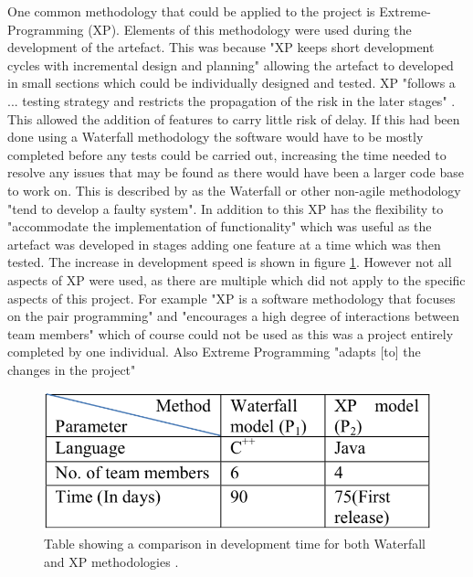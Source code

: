 \documentclass[11pt,a4paper]{report}
\begin{document}
One common methodology that could be applied to the project is Extreme-Programming (XP). Elements of this methodology were used during the development of the artefact. This was because "XP keeps short development cycles with incremental design and planning" \citep{XPsharma2016analysis} allowing the artefact to developed in small sections which could be individually designed and tested. XP "follows a ... testing strategy and restricts the propagation of the risk in the later stages" \citep{XPsharma2016analysis}. This allowed the addition of features to carry little risk of delay. If this had been done using a Waterfall methodology the software would have to be mostly completed before any tests could be carried out, increasing the time needed to resolve any issues that may be found as there would have been a larger code base to work on. This is described by \cite{XPsharma2016analysis} as the Waterfall or other non-agile methodology "tend to develop a faulty system". In addition to this XP has the flexibility to "accommodate the implementation of functionality" \citep{XPsharma2016analysis} which was useful as the artefact was developed in stages adding one feature at a time which was then tested. The increase in development speed is shown in figure \ref{fig:XPvsWater}. However not all aspects of XP were used, as there are multiple which did not apply to the specific aspects of this project. For example "XP is a software methodology that focuses on the pair programming" and "encourages a high degree of interactions between team members" \citep{XPsharma2016analysis} which of course could not be used as this was a project entirely completed by one individual. Also Extreme Programming "adapts [to] the changes in the project"

\begin{figure}
 \centering
 \includegraphics[scale = 0.45]{XP_vs_Waterfall.png}
 \caption{Table showing a comparison in development time for both Waterfall and XP 		methodologies \citep{XPsharma2016analysis}.}
 \label{fig:XPvsWater}
\end{figure}
\end{document}
